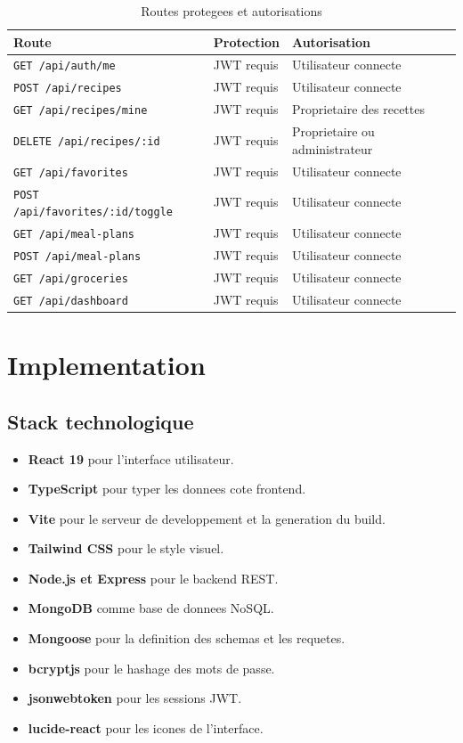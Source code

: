 \documentclass[12pt,a4paper]{report}
\begin{document}
\begin{table}[H]
  \centering
  \caption{Routes protegees et autorisations}
  \begin{tabular}{p{5cm}p{4cm}p{5cm}}
    \toprule
    \textbf{Route} & \textbf{Protection} & \textbf{Autorisation}\\
    \midrule
    \texttt{GET /api/auth/me} & JWT requis & Utilisateur connecte\\
    \texttt{POST /api/recipes} & JWT requis & Utilisateur connecte\\
    \texttt{GET /api/recipes/mine} & JWT requis & Proprietaire des recettes\\
    \texttt{DELETE /api/recipes/:id} & JWT requis & Proprietaire ou administrateur\\
    \texttt{GET /api/favorites} & JWT requis & Utilisateur connecte\\
    \texttt{POST /api/favorites/:id/toggle} & JWT requis & Utilisateur connecte\\
    \texttt{GET /api/meal-plans} & JWT requis & Utilisateur connecte\\
    \texttt{POST /api/meal-plans} & JWT requis & Utilisateur connecte\\
    \texttt{GET /api/groceries} & JWT requis & Utilisateur connecte\\
    \texttt{GET /api/dashboard} & JWT requis & Utilisateur connecte\\
    \bottomrule
  \end{tabular}
\end{table}

\chapter{Implementation}

\section{Stack technologique}

\begin{itemize}[leftmargin=*]
  \item \textbf{React 19} pour l'interface utilisateur.
  \item \textbf{TypeScript} pour typer les donnees cote frontend.
  \item \textbf{Vite} pour le serveur de developpement et la generation du build.
  \item \textbf{Tailwind CSS} pour le style visuel.
  \item \textbf{Node.js et Express} pour le backend REST.
  \item \textbf{MongoDB} comme base de donnees NoSQL.
  \item \textbf{Mongoose} pour la definition des schemas et les requetes.
  \item \textbf{bcryptjs} pour le hashage des mots de passe.
  \item \textbf{jsonwebtoken} pour les sessions JWT.
  \item \textbf{lucide-react} pour les icones de l'interface.
\end{itemize}
\end{document}
